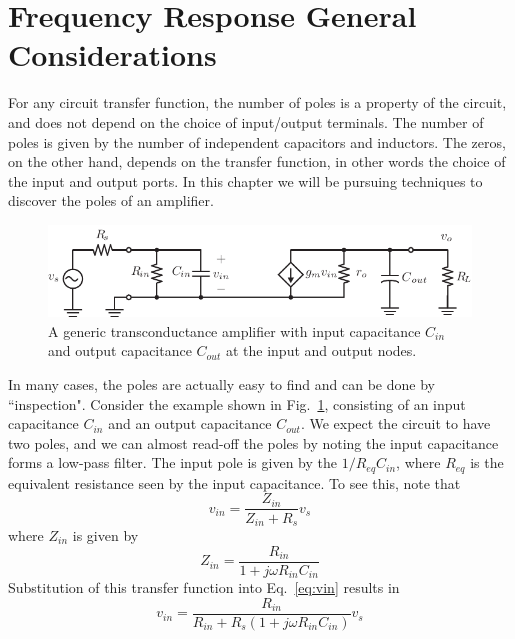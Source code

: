 \section{Frequency Response General Considerations}
For any circuit transfer function, the number of poles is a property of the circuit, and does not depend on the choice of input/output terminals.  The number of poles is given by the number of independent capacitors and inductors.  The zeros, on the other hand, depends on the transfer function, in other words the choice of the input and output ports.  In this chapter we will be pursuing techniques to discover the poles of an amplifier.  
\begin{figure}[tb]
\centering
\includegraphics[scale=1]{amp_two_poles}
\caption{A generic transconductance amplifier with input capacitance $C_{in}$ and output capacitance $C_{out}$ at the input and output nodes.}
\label{fig:amp_two_poles_indep}
\end{figure}
In many cases, the poles are actually easy to find and can be done by ``inspection".  Consider the example shown in Fig.~\ref{fig:amp_two_poles_indep}, consisting of an input capacitance $C_{in}$ and an output capacitance $C_{out}$.  We expect the circuit to have two poles, and we can almost read-off the poles by noting the input capacitance forms a low-pass filter.  The input pole is given by the $1/R_{eq}C_{in}$, where $R_{eq}$ is the equivalent resistance seen by the input capacitance.  To see this, note that
    \begin{equation}
        v_{in} = \frac{Z_{in}}{Z_{in} + R_s} v_s \label{eq:vin}
    \end{equation} 
where $Z_{in}$ is given by
    \begin{equation}
        Z_{in} = \frac{R_{in}}{1 + j\omega R_{in} C_{in}}
    \end{equation}
Substitution of this transfer function into Eq.~\ref{eq:vin} results in
    \begin{equation}
        v_{in} = \frac{R_{in}}{R_{in} + R_s(1 + j\omega R_{in} C_{in})} v_s 
    \end{equation}

